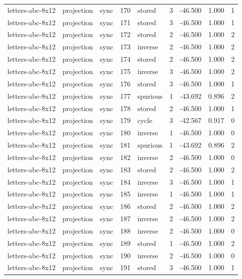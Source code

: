 \begin{tabular}{lllrlrrrr}
letters-abc-8x12 & projection & sync & 170 & stored & 3 & -46.500 & 1.000 & 1 \\
letters-abc-8x12 & projection & sync & 171 & stored & 3 & -46.500 & 1.000 & 1 \\
letters-abc-8x12 & projection & sync & 172 & stored & 2 & -46.500 & 1.000 & 2 \\
letters-abc-8x12 & projection & sync & 173 & inverse & 2 & -46.500 & 1.000 & 2 \\
letters-abc-8x12 & projection & sync & 174 & stored & 2 & -46.500 & 1.000 & 2 \\
letters-abc-8x12 & projection & sync & 175 & inverse & 3 & -46.500 & 1.000 & 2 \\
letters-abc-8x12 & projection & sync & 176 & stored & 3 & -46.500 & 1.000 & 1 \\
letters-abc-8x12 & projection & sync & 177 & spurious & 1 & -43.692 & 0.896 & 2 \\
letters-abc-8x12 & projection & sync & 178 & stored & 2 & -46.500 & 1.000 & 1 \\
letters-abc-8x12 & projection & sync & 179 & cycle & 3 & -42.567 & 0.917 & 0 \\
letters-abc-8x12 & projection & sync & 180 & inverse & 1 & -46.500 & 1.000 & 0 \\
letters-abc-8x12 & projection & sync & 181 & spurious & 1 & -43.692 & 0.896 & 2 \\
letters-abc-8x12 & projection & sync & 182 & inverse & 2 & -46.500 & 1.000 & 0 \\
letters-abc-8x12 & projection & sync & 183 & stored & 2 & -46.500 & 1.000 & 2 \\
letters-abc-8x12 & projection & sync & 184 & inverse & 3 & -46.500 & 1.000 & 1 \\
letters-abc-8x12 & projection & sync & 185 & inverse & 1 & -46.500 & 1.000 & 1 \\
letters-abc-8x12 & projection & sync & 186 & stored & 2 & -46.500 & 1.000 & 2 \\
letters-abc-8x12 & projection & sync & 187 & inverse & 2 & -46.500 & 1.000 & 2 \\
letters-abc-8x12 & projection & sync & 188 & inverse & 2 & -46.500 & 1.000 & 0 \\
letters-abc-8x12 & projection & sync & 189 & stored & 1 & -46.500 & 1.000 & 2 \\
letters-abc-8x12 & projection & sync & 190 & inverse & 2 & -46.500 & 1.000 & 0 \\
letters-abc-8x12 & projection & sync & 191 & stored & 3 & -46.500 & 1.000 & 1 \\

\end{tabular}
